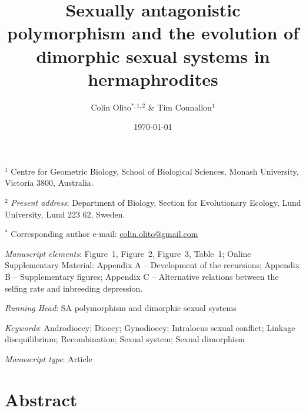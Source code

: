 \documentclass{article}
\title{Sexually antagonistic polymorphism and the evolution of dimorphic sexual systems in hermaphrodites}
\author{Colin Olito$^{\ast,1,2}$ \& Tim Connallon$^{1}$}
\date{\today}
\begin{document}
\maketitle


\noindent{} $^{1}$ Centre for Geometric Biology, School of Biological Sciences, Monash University, Victoria 3800, Australia.

\noindent{} $^{2}$ \textit{Present address}: Department of Biology, Section for Evolutionary Ecology, Lund University, Lund 223 62, Sweden.

\noindent{} $^{\ast}$ Corresponding author e-mail: \url{colin.olito@gmail.com}

\bigskip

\noindent{} \textit{Manuscript elements}: Figure~1, Figure~2, Figure~3, Table~1; Online Supplementary Material: Appendix A -- Development of the recursions; Appendix B -- Supplementary figures; Appendix C -- Alternative relations between the selfing rate and inbreeding depression.

\bigskip
\noindent{} \textit{Running Head}: SA polymorphism and dimorphic sexual systems

\bigskip

\noindent{} \textit{Keywords}: Androdioecy; Dioecy; Gynodioecy; Intralocus sexual conflict; Linkage disequilibrium; Recombination; Sexual system; Sexual dimorphism

\bigskip

\noindent{} \textit{Manuscript type}: Article

\bigskip


\linenumbers
\modulolinenumbers[1]
\renewcommand\linenumberfont{\normalfont\small}


\newpage{}
\section*{Abstract}
\end{document}
